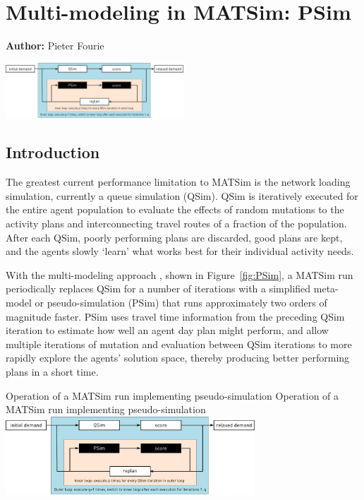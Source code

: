 \chapter{Multi-modeling in MATSim: PSim}
\label{ch:psim}

\hfill \textbf{Author:} Pieter Fourie

\begin{center} \includegraphics[width=0.5\textwidth, angle=0]{extending/figures/PSim/psim.pdf} \end{center}

\section{Introduction}
The greatest current performance limitation to MATSim is the network loading simulation, currently a queue simulation (QSim). QSim is iteratively executed for the entire agent population to evaluate the effects of random mutations to the activity plans and interconnecting travel routes of a fraction of the population. After each QSim, poorly performing plans are discarded, good plans are kept, and the agents slowly ‘learn’ what works best for their individual activity needs. 

With the multi-modeling approach \citep[][]{FourieEtAl_TRR_2013}, shown in Figure~\ref{fig:PSim}, a MATSim run periodically replaces QSim for a number of iterations with a simplified meta-model or pseudo-simulation (PSim) that runs approximately two orders of magnitude faster. PSim uses travel time information from the preceding QSim iteration to estimate how well an agent day plan might perform, and allow multiple iterations of mutation and evaluation between QSim iterations to more rapidly explore the agents' solution space, thereby producing better performing plans in a short time.

\createfigure%
{Operation of a MATSim run implementing pseudo-simulation}%
{Operation of a MATSim run implementing pseudo-simulation}%
{\label{fig:PSim}}%
{\includegraphics[width=0.7\textwidth, angle=0]{extending/figures/PSim/psim.pdf}}%
{}

